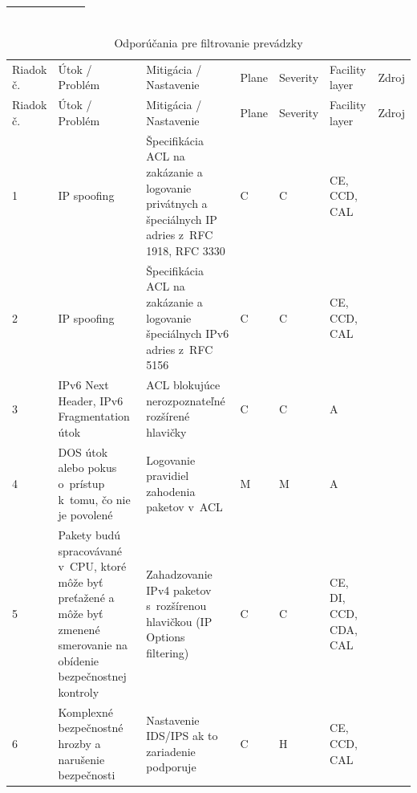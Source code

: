 \begin{longtable}[!htbp]{|C{2.5em}L{11em}L{11em}C{2.5em}C{4em}C{5em}L{2.5em}|}
	\cite{Jackson2010}
	
	\cite{CIS_DrTLsgXv24lxeIIM}\\
	
	\hline
	
\end{longtable}%


\begin{longtable}[!htbp]{|C{2.5em}L{11em}L{11em}C{2.5em}C{4em}C{5em}L{2.5em}|}
	\caption{Odporúčania pre filtrovanie prevádzky}
	\label{tab:filtering}\\ \hline
	\mbox{Riadok} č.&Útok / Problém	&Mitigácia / Nastavenie	&Plane	&Severity	&Facility layer	&Zdroj\\ \hhline{=======}
	\endfirsthead 
	\hline
	\centering
	
	Riadok č.	&Útok / Problém	&Mitigácia / Nastavenie	&Plane	&Severity	&Facility layer	&Zdroj\\ \hhline{=======}
	\endhead
	
	
	 1	&IP spoofing	&Špecifikácia ACL na zakázanie a logovanie privátnych a špeciálnych IP adries z~RFC 1918, RFC 3330	&C	&C	&CE,
	CCD,
	CAL	& \cite{Jackson2010}
	
	\cite{Singh2018}
	
	\cite{CIS_DrTLsgXv24lxeIIM}\\
	2	&IP spoofing	&Špecifikácia ACL na zakázanie a logovanie špeciálnych IPv6 adries z~RFC 5156	&C	&C	&CE,
	CCD,
	CAL	& \cite{Jackson2010}
	
	\cite{Singh2018}
	
	\cite{CIS_DrTLsgXv24lxeIIM}\\
	 3	&IPv6 Next Header,
	IPv6 Fragmentation útok	&ACL blokujúce nerozpoznateľné rozšírené hlavičky	&C	&C	&A	& \cite{Podermanski1922015}
	
	\cite{Gregr2622015}\\
	4	&DOS útok alebo pokus o~prístup k~tomu, čo nie je povolené	&Logovanie pravidiel zahodenia paketov v~ACL	&M	&M	&A	& \cite{Akin2002}\\
	 5	&Pakety budú spracovávané v~CPU, ktoré môže byť preťažené a môže byť zmenené smerovanie na obídenie bezpečnostnej kontroly	&Zahadzovanie IPv4 paketov s~rozšírenou hlavičkou (IP Options filtering)	&C	&C	&CE,
	DI,
	CCD,
	CDA,
	CAL	& \cite{Singh2018}\\
	6	&Komplexné bezpečnostné hrozby a narušenie bezpečnosti	&Nastavenie IDS/IPS ak to zariadenie podporuje	&C	&H	&CE, CCD,
	CAL	& \cite{Hucaby2010}\\
	\hline
\end{longtable}%
\newpage

